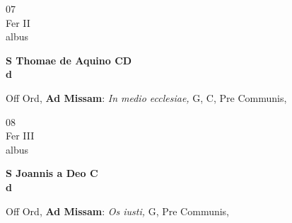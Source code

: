 \documentclass[10pt, openany]{book}
\begin{document}
        \begin{center}
            \begin{minipage}{3.5in}
                \vspace{2em}
                \begin{minipage}{0.5in}
                    {\Huge 07} \\
                    {\normalsize Fer II} \\
                    {\normalsize albus}
                \end{minipage}
                \begin{minipage}{3.0in}
                    \textbf{ \large S Thomae de Aquino CD \\
                    \textnormal{\normalsize d}} \\ 
                \end{minipage}
                \begin{justify}Off Ord, \textbf{Ad Missam}: \textit{In medio ecclesiae,} G, C, Pre Communis,   
                \end{justify}
            \end{minipage}
        \end{center}
    
        \begin{center}
            \begin{minipage}{3.5in}
                \vspace{2em}
                \begin{minipage}{0.5in}
                    {\Huge 08} \\
                    {\normalsize Fer III} \\
                    {\normalsize albus}
                \end{minipage}
                \begin{minipage}{3.0in}
                    \textbf{ \large S Joannis a Deo C \\
                    \textnormal{\normalsize d}} \\ 
                \end{minipage}
                \begin{justify}Off Ord, \textbf{Ad Missam}: \textit{Os iusti,} G, Pre Communis,   
                \end{justify}
            \end{minipage}
        \end{center}
    
\end{document}
